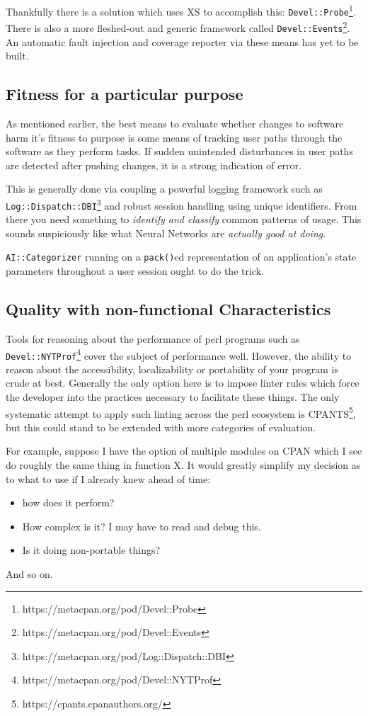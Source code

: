\documentclass{article}
\begin{document}
Thankfully there is a solution which uses XS to accomplish this: \texttt{Devel::Probe}\footnote{https://metacpan.org/pod/Devel::Probe}.
There is also a more fleshed-out and generic framework called \texttt{Devel::Events}\footnote{https://metacpan.org/pod/Devel::Events}.
An automatic fault injection and coverage reporter via these means has yet to be built.

\subsection{Fitness for a particular purpose}

As mentioned earlier, the best means to evaluate whether changes to software harm it's fitness to purpose is some means of tracking user paths through the software as they perform tasks.
If sudden unintended disturbances in user paths are detected after pushing changes, it is a strong indication of error.

This is generally done via coupling a powerful logging framework such as \texttt{Log::Dispatch::DBI}\footnote{https://metacpan.org/pod/Log::Dispatch::DBI} and robust session handling using unique identifiers.
From there you need something to \textit{identify and classify} common patterns of usage.
This sounds suspiciously like what Neural Networks are \textit{actually good at doing}.

\texttt{AI::Categorizer} running on a \texttt{pack()}ed representation of an application's state parameters throughout a user session ought to do the trick.

\subsection{Quality with non-functional Characteristics}

Tools for reasoning about the performance of perl programs such as \texttt{Devel::NYTProf}\footnote{https://metacpan.org/pod/Devel::NYTProf} cover the subject of performance well.
However, the ability to reason about the accessibility, localizability or portability of your program is crude at best.
Generally the only option here is to impose linter rules which force the developer into the practices necessary to facilitate these things.
The only systematic attempt to apply such linting across the perl ecosystem is CPANTS\footnote{https://cpants.cpanauthors.org/},
but this could stand to be extended with more categories of evaluation.

For example, suppose I have the option of multiple modules on CPAN which I see do roughly the same thing in function X.
It would greatly simplify my decision as to what to use if I already knew ahead of time:
\begin{itemize}
\item how does it perform?
\item How complex is it?  I may have to read and debug this.
\item Is it doing non-portable things?
\end{itemize}
And so on.
\end{document}
